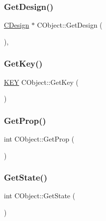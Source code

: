 \mbox{\label{classCObject_a8a45a96cdd9a089b518c93fd29b50a7e}} 
\subsubsection{\texorpdfstring{GetDesign()}{GetDesign()}}
{\footnotesize\ttfamily \mbox{\hyperlink{classCDesign}{C\+Design}} $\ast$ C\+Object\+::\+Get\+Design (\begin{DoxyParamCaption}{ }\end{DoxyParamCaption})\hspace{0.3cm}{\ttfamily [inline]}, {\ttfamily [static]}}

\mbox{\label{classCObject_af40e7f490ecf17319ce70f9b0ee723c7}} 
\subsubsection{\texorpdfstring{GetKey()}{GetKey()}}
{\footnotesize\ttfamily \mbox{\hyperlink{res2dmp_8cpp_a8ae9d53f33f46cfcfcb9736e6351452a}{K\+EY}} C\+Object\+::\+Get\+Key (\begin{DoxyParamCaption}{ }\end{DoxyParamCaption})\hspace{0.3cm}{\ttfamily [inline]}}

\mbox{\label{classCObject_afc32a8e7c4450a95c2a6333d7e3319b4}} 
\subsubsection{\texorpdfstring{GetProp()}{GetProp()}}
{\footnotesize\ttfamily int C\+Object\+::\+Get\+Prop (\begin{DoxyParamCaption}{ }\end{DoxyParamCaption})\hspace{0.3cm}{\ttfamily [inline]}}

\mbox{\label{classCObject_a94f72fd4b4155dc18decb9d53f42dc99}} 
\subsubsection{\texorpdfstring{GetState()}{GetState()}}
{\footnotesize\ttfamily int C\+Object\+::\+Get\+State (\begin{DoxyParamCaption}{ }\end{DoxyParamCaption})\hspace{0.3cm}{\ttfamily [inline]}}

